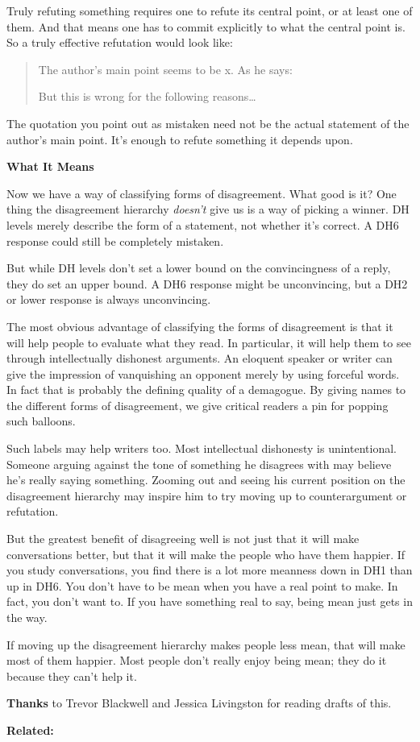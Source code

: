 Truly refuting something requires one to refute its central point, or at
least one of them. And that means one has to commit explicitly to what
the central point is. So a truly effective refutation would look like:

\begin{quote}
The author's main point seems to be x. As he says:

\begin{quote}
\end{quote}

But this is wrong for the following reasons\ldots{}
\end{quote}

The quotation you point out as mistaken need not be the actual statement
of the author's main point. It's enough to refute something it depends
upon.

\textbf{What It Means}

Now we have a way of classifying forms of disagreement. What good is it?
One thing the disagreement hierarchy \emph{doesn't} give us is a way of
picking a winner. DH levels merely describe the form of a statement, not
whether it's correct. A DH6 response could still be completely mistaken.

But while DH levels don't set a lower bound on the convincingness of a
reply, they do set an upper bound. A DH6 response might be unconvincing,
but a DH2 or lower response is always unconvincing.

The most obvious advantage of classifying the forms of disagreement is
that it will help people to evaluate what they read. In particular, it
will help them to see through intellectually dishonest arguments. An
eloquent speaker or writer can give the impression of vanquishing an
opponent merely by using forceful words. In fact that is probably the
defining quality of a demagogue. By giving names to the different forms
of disagreement, we give critical readers a pin for popping such
balloons.

Such labels may help writers too. Most intellectual dishonesty is
unintentional. Someone arguing against the tone of something he
disagrees with may believe he's really saying something. Zooming out and
seeing his current position on the disagreement hierarchy may inspire
him to try moving up to counterargument or refutation.

But the greatest benefit of disagreeing well is not just that it will
make conversations better, but that it will make the people who have
them happier. If you study conversations, you find there is a lot more
meanness down in DH1 than up in DH6. You don't have to be mean when you
have a real point to make. In fact, you don't want to. If you have
something real to say, being mean just gets in the way.

If moving up the disagreement hierarchy makes people less mean, that
will make most of them happier. Most people don't really enjoy being
mean; they do it because they can't help it.

\textbf{Thanks} to Trevor Blackwell and Jessica Livingston for reading
drafts of this.

\textbf{Related:}
